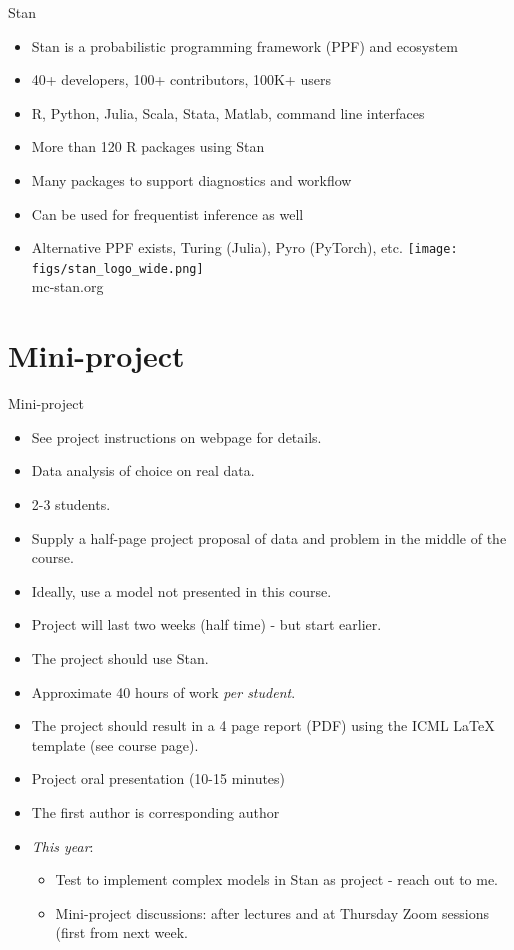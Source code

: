 \documentclass[10pt]{beamer}
\begin{document}
\begin{frame}{Stan}

\begin{itemize}
  \item Stan is a probabilistic programming framework (PPF) and ecosystem
  \item 40+ developers, 100+ contributors, 100K+ users
  \item R, Python, Julia, Scala, Stata, Matlab, command line interfaces
  \item More than 120 R packages using Stan
  \item Many packages to support diagnostics and workflow
  \item Can be used for frequentist inference as well
  \item Alternative PPF exists, Turing (Julia), Pyro (PyTorch), etc.
  \center
  \vspace{\baselineskip}
  \texttt{[image: figs/stan\_logo\_wide.png]}\\
  mc-stan.org
\end{itemize}

\end{frame}

\section{Mini-project}
\frame{\sectionpage}

\begin{frame}{Mini-project}

\begin{itemize}
\item See project instructions on webpage for details.
\item Data analysis of choice on real data.
\item 2-3 students.\pause
\item Supply a half-page project proposal of data and problem in the middle of the course.\pause
\item Ideally, use a model not presented in this course.
\item Project will last two weeks (half time) - but start earlier.
\item The project should use Stan.
\item Approximate 40 hours of work \emph{per student}.\pause
\item The project should result in a 4 page report (PDF) using the ICML LaTeX template (see course page).
\item Project oral presentation (10-15 minutes)\pause
\item The first author is corresponding author\pause
\item \emph{This year}:
\begin{itemize}
\item Test to implement complex models in Stan as project - reach out to me.
\item Mini-project discussions: after lectures and at Thursday Zoom sessions (first from next week.
\end{itemize}
\end{itemize}
\end{frame}
\end{document}
